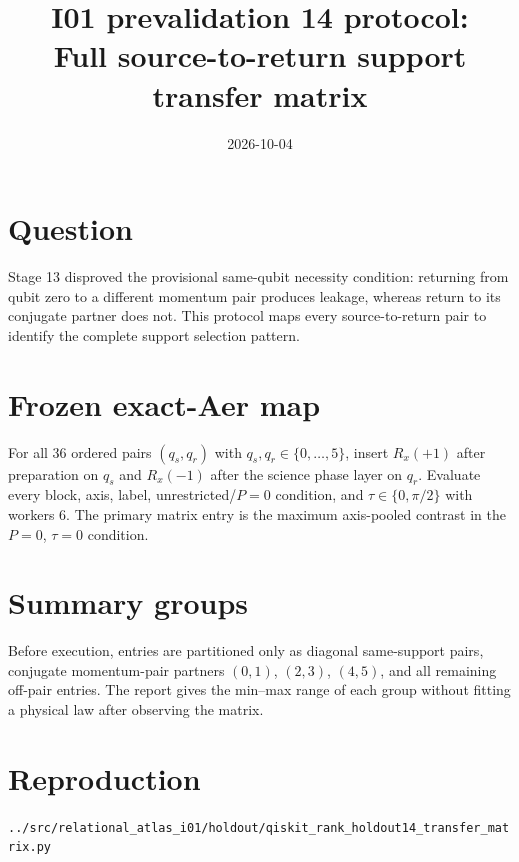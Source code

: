 \documentclass[11pt]{article}
\begin{document}
\title{I01 prevalidation 14 protocol:\\Full source-to-return support transfer matrix}
\date{2026-10-04}
\maketitle

\section*{Question}
Stage 13 disproved the provisional same-qubit necessity condition: returning from
qubit zero to a different momentum pair produces leakage, whereas return to its
conjugate partner does not. This protocol maps every source-to-return pair to
identify the complete support selection pattern.

\section*{Frozen exact-Aer map}
For all $36$ ordered pairs $(q_s,q_r)$ with $q_s,q_r\in\{0,\ldots,5\}$, insert
$R_x(+1)$ after preparation on $q_s$ and $R_x(-1)$ after the science phase layer
on $q_r$. Evaluate every block, axis, label, unrestricted/$P=0$ condition, and
$\tau\in\{0,\pi/2\}$ with workers 6. The primary matrix entry is the maximum
axis-pooled contrast in the $P=0$, $\tau=0$ condition.

\section*{Summary groups}
Before execution, entries are partitioned only as diagonal same-support pairs,
conjugate momentum-pair partners $(0,1)$, $(2,3)$, $(4,5)$, and all remaining
off-pair entries. The report gives the min--max range of each group without fitting
a physical law after observing the matrix.

\section*{Reproduction}
\texttt{../src/relational\_atlas\_i01/holdout/qiskit\_rank\_holdout14\_transfer\_matrix.py}
\end{document}
